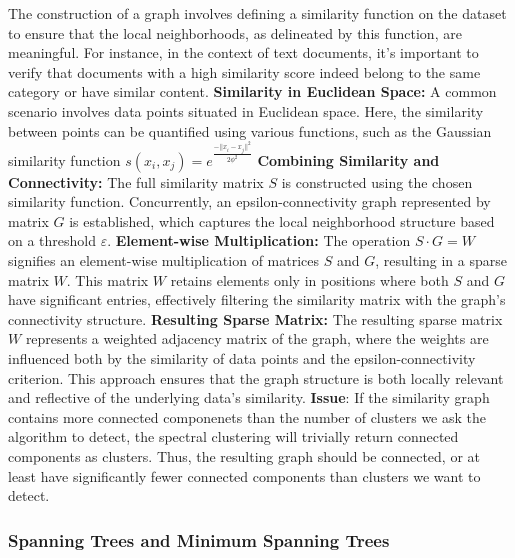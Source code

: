 \documentclass[unicode,11pt,a4paper,oneside,numbers=endperiod,openany]{scrartcl}
\begin{document}
The construction of a graph involves defining a similarity function on the dataset to ensure that the local neighborhoods, as delineated by this function, are meaningful. For instance, in the context of text documents, it's important to verify that documents with a high similarity score indeed belong to the same category or have similar content.
\newline \newline
\textbf{Similarity in Euclidean Space:}
A common scenario involves data points situated in Euclidean space. Here, the similarity between points can be quantified using various functions, such as the Gaussian similarity function \quad $s(x_i, x_j) = e ^{\frac{-||x_i-x_j||^2}{2 \phi^2}}$
\newline \newline
\textbf{Combining Similarity and Connectivity:}
The full similarity matrix \( S \) is constructed using the chosen similarity function. Concurrently, an epsilon-connectivity graph represented by matrix \( G \) is established, which captures the local neighborhood structure based on a threshold \( \varepsilon \).
\newline \newline
\textbf{Element-wise Multiplication:}
The operation \( S \cdot G = W \) signifies an element-wise multiplication of matrices \( S \) and \( G \), resulting in a sparse matrix \( W \). This matrix \( W \) retains elements only in positions where both \( S \) and \( G \) have significant entries, effectively filtering the similarity matrix with the graph's connectivity structure.
\newline \newline
\textbf{Resulting Sparse Matrix:}
The resulting sparse matrix \( W \) represents a weighted adjacency matrix of the graph, where the weights are influenced both by the similarity of data points and the epsilon-connectivity criterion. This approach ensures that the graph structure is both locally relevant and reflective of the underlying data's similarity.
\newline \newline
\textbf{Issue}: If the similarity graph contains more connected componenets than the number of clusters we ask the algorithm to detect, the spectral clustering will trivially return connected components as clusters. Thus, the resulting graph should be connected, or at least have significantly fewer connected components than clusters we want to detect.

\subsubsection{Spanning Trees and Minimum Spanning Trees}
\end{document}
